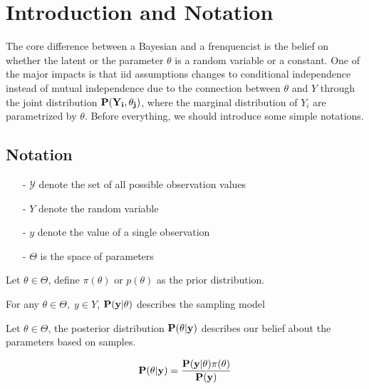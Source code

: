 \chapter{Introduction and Notation}

The core difference between a Bayesian and a frenquencist is the belief on whether the latent or the parameter $\theta$ is a random variable or a constant. One of the major impacts is that iid assumptions changes to conditional independence instead of mutual independence due to the connection between $\theta$ and $Y$ through the joint distribution $\bf{P}(Y_i, \theta_j)$, where the marginal distribution of $Y_i$ are parametrized by $\theta$. Before everything, we should introduce some simple notations.

\section{Notation}
\begin{enumerate}
    \item[-] $\mathcal{Y}$ denote the set of all possible observation values
    \item[-] $Y$ denote the random variable
    \item[-] $y$ denote the value of a single observation
    \item[-] $\Theta$ is the space of parameters
\end{enumerate}

\begin{note}
    Let $\theta \in \Theta$, define $\pi(\theta)$ or $p(\theta)$ as the prior distribution.
\end{note}

\begin{note}
    For any $\theta \in \Theta, \; y \in Y$, $\bf{P}(y|\theta)$ describes the sampling model 
\end{note}

\begin{note}
    Let $\theta \in \Theta$, the posterior distribution $\bf{P}(\theta | y)$ describes our belief about the parameters based on samples.
\end{note}

\begin{theorem}
    \begin{equation}
        \bf{P}(\theta|y) = \frac{\bf{P}(y|\theta)\pi(\theta)}{\bf{P}(y)}
    \end{equation}
\end{theorem}

